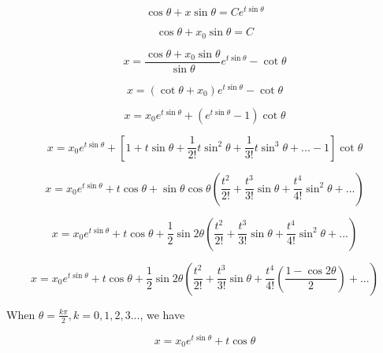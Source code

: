 \documentclass{article}
\begin{document}
\begin{equation}
    \cos \theta + x \sin \theta = C e^{t \sin \theta}
\end{equation}

\begin{equation}
    \cos \theta + x_0 \sin \theta = C
\end{equation}

\begin{equation}
   x = \frac{\cos \theta + x_0 \sin \theta}{\sin \theta} e^{t \sin \theta} - \cot \theta
\end{equation}

\begin{equation}
   x = (\cot \theta + x_0) e^{t \sin \theta} - \cot \theta
\end{equation}

\begin{equation}
   x =  x_0 e^{t \sin \theta} + (e^{t \sin \theta} - 1) \cot \theta
\end{equation}

\begin{equation}
   x =  x_0 e^{t \sin \theta} + [1 + t \sin \theta + \frac{1}{2!} t\sin^2 \theta  + \frac{1}{3!} t \sin^3 \theta + ... - 1] \cot \theta
\end{equation}

\begin{equation}
   x =  x_0 e^{t \sin \theta} + t \cos \theta + \sin \theta \cos \theta (\frac{t^2}{2!} + \frac{t^3}{3!} \sin \theta + \frac{t^4}{4!} \sin^2 \theta + ...)
\end{equation}

\begin{equation}
   x =  x_0 e^{t \sin \theta} + t \cos \theta + \frac{1}{2} \sin 2\theta (\frac{t^2}{2!} + \frac{t^3}{3!} \sin \theta + \frac{t^4}{4!} \sin^2 \theta + ...)
\end{equation}

\begin{equation}
   x =  x_0 e^{t \sin \theta} + t \cos \theta + \frac{1}{2} \sin 2\theta (\frac{t^2}{2!} + \frac{t^3}{3!} \sin \theta + \frac{t^4}{4!} (\frac{1 - \cos 2\theta}{2}) + ...)
\end{equation}

When $\theta = \frac{k \pi}{2}, k = 0, 1, 2, 3...$, we have

\begin{equation}
    x = x_0 e^{t \sin \theta} + t \cos \theta
\end{equation}
\end{document}
